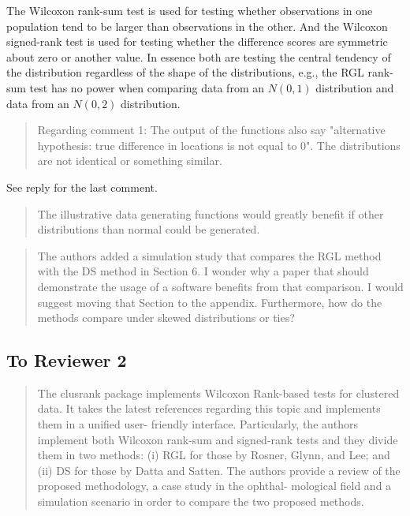 \documentclass[12pt]{article}
\newenvironment{comment}%
{\begin{quotation}\noindent\small\it\ignorespaces%
  }{\end{quotation}}
\begin{document}
The Wilcoxon rank-sum test is used for testing whether observations in one
population tend to be larger than observations in the other. And the
Wilcoxon signed-rank test is used for testing whether the difference scores
are symmetric about zero or another value. In essence both are testing the
central tendency of the distribution regardless of the shape of the
distributions, e.g., the RGL rank-sum test has no power when comparing data
from an $N(0, 1)$ distribution and data from an $N(0, 2)$ distribution.

\begin{comment}
Regarding comment 1: The output of the functions also say "alternative
hypothesis: true difference in locations is not equal to 0". The distributions are
not identical or something similar.
\end{comment}

See reply for the last comment.

\begin{comment}
The illustrative data generating functions would greatly benefit if other
distributions than normal could be generated.
\end{comment}

\begin{comment}
The authors added a simulation study that compares the RGL method with the
DS method in Section 6. I wonder why a paper that should demonstrate the
usage of a software benefits from that comparison. I would suggest moving
that Section to the appendix. Furthermore, how do the methods compare
under skewed distributions or ties?
\end{comment}


\subsection*{To Reviewer 2}

\begin{comment}
The clusrank package implements Wilcoxon Rank-based tests for clustered
data. It takes the latest references regarding this topic and implements
them in a unified user- friendly interface. Particularly, the authors
implement both Wilcoxon rank-sum and signed-rank tests and they divide
them in two methods: (i) RGL for those by Rosner, Glynn, and Lee; and (ii)
DS for those by Datta and Satten.  The authors provide a review of the
proposed methodology, a case study in the ophthal- mological field and a
simulation scenario in order to compare the two proposed methods.
\end{comment}
\end{document}
